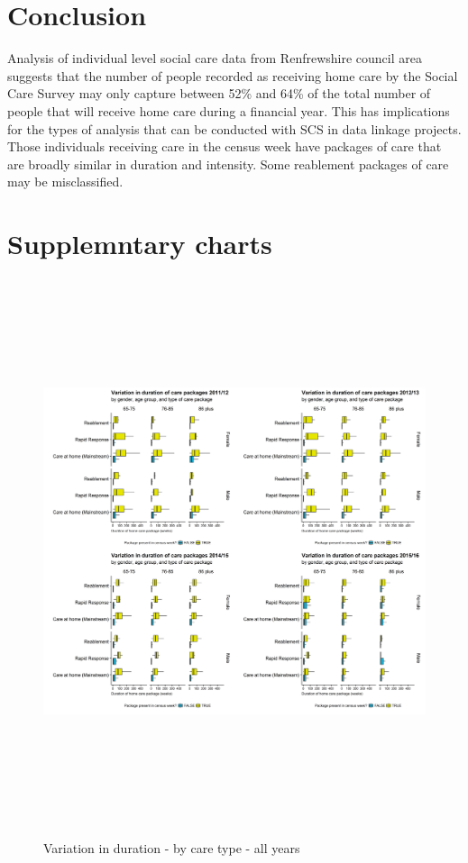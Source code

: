 \documentclass[]{article}
\begin{document}
\section{Conclusion}\label{sec:renf-conc}

Analysis of individual level social care data from Renfrewshire council
area suggests that the number of people recorded as receiving home care
by the Social Care Survey may only capture between 52\% and 64\% of the
total number of people that will receive home care during a financial
year. This has implications for the types of analysis that can be
conducted with SCS in data linkage projects. Those individuals receiving
care in the census week have packages of care that are broadly similar
in duration and intensity. Some reablement packages of care may be
misclassified.

\section{Supplemntary charts}\label{sec:renf-supp-charts}

\begin{figure}[]
  \centering
    \caption{Variation in duration - by care type - all years}
    \includegraphics[width = 16cm, height = 16cm]{figures/chapter-renf/12-comb-duration-type.png}
    \label{fig:renf-duration-type-all}
\end{figure}
\end{document}
